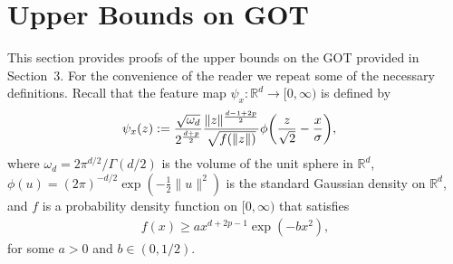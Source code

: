 \documentclass{article}
\theoremstyle{definition}
\newcommand{\reals}{\mathbb{R}}
\let\originalleft\left
\let\originalright\right
\renewcommand{\left}{\mathopen{}\mathclose\bgroup\originalleft}
\renewcommand{\right}{\aftergroup\egroup\originalright}
\begin{document}
\section{Upper Bounds on GOT} 
\label{sec_proof_UB}

This section provides proofs of the upper bounds on the GOT provided in  Section~3. For the convenience of the reader we repeat some of the necessary definitions. Recall that the feature map $\psi_x \colon \reals^d \to [0, \infty)$ is defined by
\begin{align}
    \psi_x(z) &: = \frac{ \sqrt{\omega_d}}{ 2^\frac{d+p}{2}} \frac{ \|z\|^\frac{d-1  + 2p}{2}}{ \sqrt{ f(\|z\|)}} \phi\left(\frac{ z}{\sqrt{2}}  - \frac{ x}{\sigma} \right ), \label{seq:psi}
\end{align}
where  $\omega_d = 2\pi^{d/2} / \Gamma(d/2)$ is the volume of the unit sphere in $\reals^d$, $\phi(u) = (2\pi)^{-d/2} \exp( -\frac{1}{2} \|u\|^2)$ is the standard Gaussian density on $\reals^d$, and $f$ is a probability density function on $[0, \infty)$ that satisfies 
\begin{align}
f(x) \ge a x^{d + 2p -1}  \exp( - b  x^2),
\label{eq:fLB}
\end{align}
for some $a > 0$ and $b \in (0,1/2)$. 
\end{document}
